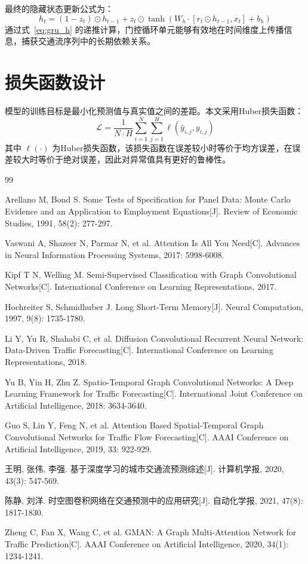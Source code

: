 \documentclass[12pt,a4paper,twoside]{ctexbook}
\begin{document}
最终的隐藏状态更新公式为：
\begin{equation}
h_t = (1 - z_t) \odot h_{t-1} + z_t \odot \tanh\left(W_h \cdot [r_t \odot h_{t-1}, x_t] + b_h\right)
\label{eq:gru_h}
\end{equation}
通过式~\eqref{eq:gru_h} 的递推计算，门控循环单元能够有效地在时间维度上传播信息，捕获交通流序列中的长期依赖关系。

\section{损失函数设计}
模型的训练目标是最小化预测值与真实值之间的差距。本文采用Huber损失函数：
\begin{equation}
\mathcal{L} = \frac{1}{N \cdot H} \sum_{i=1}^{N} \sum_{j=1}^{H} \ell\left(\hat{y}_{i,j}, y_{i,j}\right)
\label{eq:loss}
\end{equation}
其中 $\ell(\cdot)$ 为Huber损失函数，该损失函数在误差较小时等价于均方误差，在误差较大时等价于绝对误差，因此对异常值具有更好的鲁棒性。

\begin{thebibliography}{99}

Arellano M, Bond S. Some Tests of Specification for Panel Data: Monte Carlo Evidence and an Application to Employment Equations[J]. Review of Economic Studies, 1991, 58(2): 277-297.

Vaswani A, Shazeer N, Parmar N, et al. Attention Is All You Need[C]. Advances in Neural Information Processing Systems, 2017: 5998-6008.

Kipf T N, Welling M. Semi-Supervised Classification with Graph Convolutional Networks[C]. International Conference on Learning Representations, 2017.

Hochreiter S, Schmidhuber J. Long Short-Term Memory[J]. Neural Computation, 1997, 9(8): 1735-1780.

Li Y, Yu R, Shahabi C, et al. Diffusion Convolutional Recurrent Neural Network: Data-Driven Traffic Forecasting[C]. International Conference on Learning Representations, 2018.

Yu B, Yin H, Zhu Z. Spatio-Temporal Graph Convolutional Networks: A Deep Learning Framework for Traffic Forecasting[C]. International Joint Conference on Artificial Intelligence, 2018: 3634-3640.

Guo S, Lin Y, Feng N, et al. Attention Based Spatial-Temporal Graph Convolutional Networks for Traffic Flow Forecasting[C]. AAAI Conference on Artificial Intelligence, 2019, 33: 922-929.

王明, 张伟, 李强. 基于深度学习的城市交通流预测综述[J]. 计算机学报, 2020, 43(3): 547-569.

陈静, 刘洋. 时空图卷积网络在交通预测中的应用研究[J]. 自动化学报, 2021, 47(8): 1817-1830.

Zheng C, Fan X, Wang C, et al. GMAN: A Graph Multi-Attention Network for Traffic Prediction[C]. AAAI Conference on Artificial Intelligence, 2020, 34(1): 1234-1241.

\end{thebibliography}
\end{document}
